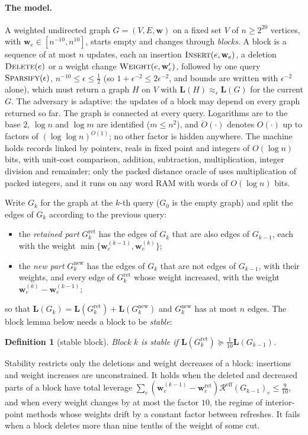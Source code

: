 \documentclass[11pt]{article}
\newtheorem{definition}[theorem]{Definition}
\theoremstyle{remark}
\newcommand{\LL}{\mathbf L}
\newcommand{\ww}{\mathbf w}
\newcommand{\Gret}{G^{\mathrm{ret}}}
\newcommand{\Gnew}{G^{\mathrm{new}}}
\newcommand{\Rcal}{\mathcal{R}}
\newcommand{\Reff}{\Rcal^{\mathrm{eff}}}
\newcommand{\Odouble}{\ddot{O}}
\begin{document}
\paragraph{The model.}
A weighted undirected graph $G=(V,E,\ww)$ on a fixed set $V$ of $n\ge2^{20}$
vertices, with $\ww_e\in[n^{-10},n^{10}]$, starts empty and changes through
\emph{blocks}.
A block is a sequence of at most $n$ updates, each an insertion
$\textsc{Insert}(e,\ww_e)$, a deletion $\textsc{Delete}(e)$ or a weight change
$\textsc{Weight}(e,\ww'_e)$, followed by one query $\textsc{Sparsify}(\epsilon)$,
$n^{-10}\le\epsilon\le\frac12$ (so $1+\epsilon^{-2}\le2\epsilon^{-2}$, and bounds
are written with $\epsilon^{-2}$ alone), which must return a graph $H$ on $V$ with
$\LL(H)\approx_{\epsilon}\LL(G)$ for the current $G$.
The adversary is adaptive: the updates of a block may depend on every graph
returned so far.
The graph is connected at every query.
Logarithms are to the base $2$, $\log n$ and $\log m$ are identified
($m\le n^{2}$), and $\Odouble(\cdot)$ denotes $O(\cdot)$ up to factors of
$(\log\log n)^{O(1)}$; no other factor is hidden anywhere.
The machine holds records linked by pointers, reals in fixed point and
integers of $O(\log n)$ bits, with unit-cost comparison, addition,
subtraction, multiplication, integer division and remainder; only the packed
distance oracle of  uses multiplication of packed integers,
and it runs on any word RAM with words of $O(\log n)$ bits.

Write $G_{k}$ for the graph at the $k$-th query ($G_0$ is the empty graph) and
split the edges of $G_{k}$ according to the previous query:
\begin{itemize}[leftmargin=*]
\item the \emph{retained part} $\Gret_k$ has the edges of $G_k$ that are also
edges of $G_{k-1}$, each with the weight $\min\{\ww^{(k-1)}_e,\ww^{(k)}_e\}$;
\item the \emph{new part} $\Gnew_k$ has the edges of $G_k$ that are not edges of
$G_{k-1}$, with their weights, and every edge of $\Gret_k$ whose weight
increased, with the weight $\ww^{(k)}_e-\ww^{(k-1)}_e$;
\end{itemize}
so that $\LL(G_k)=\LL(\Gret_k)+\LL(\Gnew_k)$ and $\Gnew_k$ has at most $n$
edges.
The block lemma below needs a block to be \emph{stable}:
\begin{definition}[stable block]\label{def:stable}
Block $k$ is \emph{stable} if $\LL(\Gret_k)\succeq\frac1{10}\LL(G_{k-1})$.
\end{definition}
Stability restricts only the deletions and weight decreases of a
block: insertions and weight increases are unconstrained.
It holds when the deleted and decreased parts of a block have total leverage
$\sum_{e}(\ww^{(k-1)}_e-\ww^{\mathrm{ret}}_e)\Reff(G_{k-1})_e\le\frac9{10}$, and
when every weight changes by at most the factor $10$, the regime of
interior-point methods whose weights drift by a constant factor between
refreshes.
It fails when a block deletes more than nine tenths of the weight of some cut.
\end{document}
